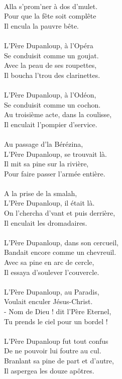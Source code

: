 \\Alla s'prom'ner à dos d'mulet. \bissimple
\\Pour que la fête soit complête
\\Il encula la pauvre bête.
\\\\L'Père Dupanloup, à l'Opéra \bissimple
\\Se conduisit comme un goujat. \bissimple
\\Avec la peau de ses roupettes,
\\Il boucha l'trou des clarinettes.
\\\\L'Père Dupanloup, à l'Odéon, \bissimple
\\Se conduisit comme un cochon. \bissimple
\\Au troisième acte, dans la coulisse,
\\Il enculait l'pompier d'service.
\\\\Au passage d'la Bérézina, \bissimple
\\L'Père Dupanloup, se trouvait là. \bissimple
\\Il mit sa pine sur la rivière,
\\Pour faire passer l'armée entière.
\\\\A la prise de la smalah, \bissimple
\\L'Père Dupanloup, il était là. \bissimple
\\On l'chercha d'vant et puis derrière,
\\Il enculait les dromadaires.
\\\\L'Père Dupanloup, dans son cercueil, \bissimple
\\Bandait encore comme un chevreuil. \bissimple
\\Avec sa pine en arc de cercle,
\\Il essaya d'soulever l'couvercle.
\\\\L'Père Dupanloup, au Paradis, \bissimple
\\Voulait enculer Jésus-Christ. \bissimple
\\- Nom de Dieu ! dit l'Père Eternel,
\\Tu prends le ciel pour un bordel !
\\\\L'Père Dupanloup fut tout confus \bissimple
\\De ne pouvoir lui foutre au cul. \bissimple
\\Branlant sa pine de part et d'autre,
\\Il aspergea les douze apôtres.


\breakpage